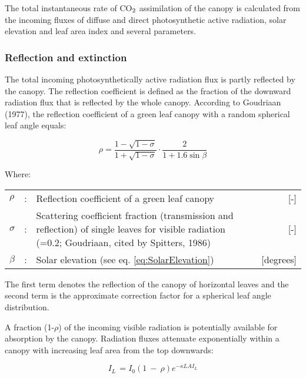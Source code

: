 The total instantaneous rate of CO$_{{\rm 2}}$ assimilation of the canopy is
calculated from the incoming fluxes of diffuse and direct photosynthetic active radiation,
solar elevation and leaf area index and several parameters.

\subsubsection{Reflection and extinction}
The total incoming photosynthetically active radiation flux is partly reflected by the
canopy. The reflection coefficient is defined as the fraction of the downward radiation
flux that is reflected by the whole canopy. According to Goudriaan (1977), the reflection
coefficient of a green leaf canopy with a random spherical leaf angle equals:

\begin{equation}
\label{eq:5.12}
\rho = {\frac{1- \sqrt{1-\sigma}}{1 + \sqrt{1-\sigma}}} \cdot {\frac{2}{1+1.6 \sin \beta }}
\end{equation}

Where:\\[5pt]
\begin{tabularx}{\textwidth}{llXr}
	$\rho$ &:& Reflection coefficient of a green leaf canopy    &    [-]\\
	$\sigma$ &:& Scattering coefficient fraction (transmission and reflection) 
	of single leaves for visible radiation   
	{\small (=0.2; Goudriaan, cited by Spitters, 1986)}  &     [-]\\  
	$\beta$ &:& Solar elevation (see eq. \ref{eq:SolarElevation})    &    [degrees]\\
\end{tabularx}

The first term denotes the reflection of the canopy of horizontal leaves and the second
term is the approximate correction factor for a spherical leaf angle distribution.

A fraction (1-$\rho$) of the incoming visible radiation is potentially available for absorption by
the canopy. Radiation fluxes attenuate exponentially within a canopy with increasing leaf
area from the top downwards:

\begin{equation}
\label{eq:5.13}
I_{L~} = I_{0} (1~-~\rho ) e^{-\kappa LAI_{L} }
\end{equation}

